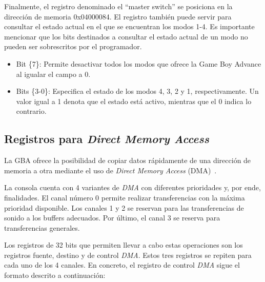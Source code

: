 Finalmente, el registro denominado el ``master switch'' se posiciona en la dirección de memoria 0x04000084. El registro también puede servir para consultar el estado actual en el que se encuentran los modos 1-4. Es importante mencionar que los bits destinados a consultar el estado actual de un modo no pueden ser sobrescritos por el programador.

\begin{itemize}
	\item Bit \{7\}: Permite desactivar todos los modos que ofrece la Game Boy Advance al igualar el campo a 0.
	\item Bits \{3-0\}: Especifica el estado de los modos 4, 3, 2 y 1, respectivamente. Un valor igual a 1 denota que el estado está activo, mientras que el 0 indica lo contrario.
\end{itemize}

\subsection{Registros para \textit{Direct Memory Access}}
La GBA ofrece la posibilidad de copiar datos rápidamente de una dirección de memoria a otra mediante el uso de \textit{Direct Memory Access} (DMA)~\cite{bib:dma_book}.

La consola cuenta con 4 variantes de \textit{DMA} con diferentes prioridades y, por ende, finalidades. El canal número 0 permite realizar transferencias con la máxima prioridad disponible. Los canales 1 y 2 se reservan para las transferencias de sonido a los buffers adecuados. Por último, el canal 3 se reserva para transferencias generales.

Los registros de 32 bits que permiten llevar a cabo estas operaciones son los registros fuente, destino y de control \textit{DMA}. Estos tres registros se repiten para cada uno de los 4 canales. En concreto, el registro de control \textit{DMA} sigue el formato descrito a continuación:


